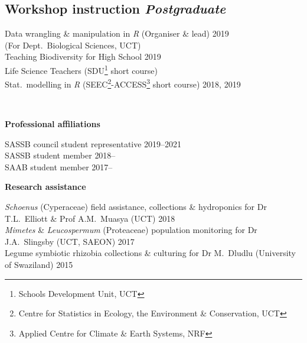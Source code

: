 \documentclass[10pt]{article}
\begin{document}
\begin{multicols}{2}
\subsection*{Workshop instruction %
                                 \hfill {\small \textmd{\textit{Postgraduate}}}}

Data wrangling \& manipulation in \textit{R} {\small (Organiser \& lead)}                       \hfill {\small             2019} \\
  \hspace{2em} {\small (For Dept.~Biological Sciences, UCT)} \\
Teaching Biodiversity for High School        \hfill {\small             2019}                                 \\
  \hspace{2em} Life Science Teachers {\small
  (SDU\footnote{Schools Development Unit,
  UCT} short course)}                         \\
Stat.~modelling in \textit{R} {\small
  (SEEC\footnote{Centre for Statistics in
  Ecology, the Environment \&
  Conservation, UCT}-ACCESS\footnote{Applied
  Centre for Climate \& Earth Systems, NRF}
  short course)}                             \hfill {\small       2018, 2019}

\

\textbf{Professional affiliations} %

SASSB council student representative               \hfill {\small 2019--2021} \\
SASSB student member                               \hfill {\small 2018--    } \\
SAAB student member                                \hfill {\small 2017--    } \\

\end{multicols} %

\textbf{Research assistance} %

\textit{Schoenus} (Cyperaceae)
field assistance, collections \& hydroponics
for Dr T.L.~Elliott \& Prof A.M.~Muasya
{\small (UCT)}                                         \hfill {\small 2018} \\
\textit{Mimetes} \& \textit{Leucospermum} (Proteaceae)
population monitoring
for Dr J.A.~Slingsby
{\small (UCT, SAEON)}                                  \hfill {\small 2017} \\
Legume symbiotic rhizobia
collections \& culturing
for Dr M.~Dludlu
{\small (University of Swaziland)}                     \hfill {\small 2015}
\end{document}
